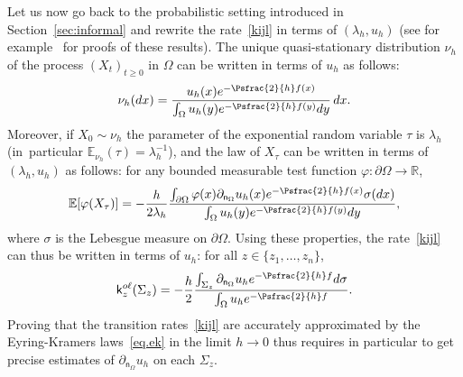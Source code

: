 Let us now go back to the probabilistic setting introduced
in Section~\ref{sec:informal} and rewrite the rate~\eqref{kijl} in
terms of $(\lambda_h,u_h)$ (see for example~\cite{le2012mathematical}
for proofs of these results). The unique quasi-stationary distribution $\nu_h$ of the
process $(X_t)_{t \ge 0}$ in $\Omega$ can be written in terms of $u_h$
as follows:\vspace*{-3pt}
\begin{equation} \label{eq.expQSD}
\nu_h(dx)=\frac{ u_{h}(x) e^{-\Psfrac{2}{h} f(x)}}{ \int_{\Omega}u_{h}(y) e^{-\Psfrac{2}{h} f(y)}dy}\, dx.
\end{equation}
Moreover, if $X_0 \sim \nu_h$ the parameter of the exponential random
variable $\tau$ is $\lambda_h$ (in~particular $\mathbb E_{\nu_h}(\tau)=\lambda_h^{-1}$), and the law of $X_\tau$ can be
written in terms of $(\lambda_h,u_h)$ as follows: for any bounded measurable test function
$\varphi: \partial \Omega \to \mathbb R$,
\begin{equation}\label{eq.dens}
\mathbb E [\varphi (X_\tau)]=- \frac{h}{2\lambda_{h}}
\frac{\int_{\partial \Omega}\varphi (x) \partial_{\mathsf n_\Omega}
u_{h}(x) e^{-\Psfrac{2}{h} f(x)} \sigma(dx) }{ \int_{\Omega} u_{h}(y) e^{-\Psfrac{2}{h} f(y)} dy},
\end{equation}
where $\sigma$ is the Lebesgue measure on $\partial \Omega$.
Using these properties, the rate~\eqref{kijl} can thus be written in terms
of $u_h$: for all $z \in \{z_1, \ldots, z_n\}$,\vspace*{-3pt}
\begin{equation}\label{eq.expk}
\mathsf k_{z}^{o\ell}(\Sigma_{z})=-\frac {h}{2} \frac{ \int_{\Sigma_{z}} \partial_{\mathsf n_\Omega}
u_h e^{-\Psfrac{2}{h} f} d\sigma }{ \int_\Omega u_h e^{-\Psfrac{2}{h} f}}.
\end{equation}
Proving that the transition rates~\eqref{kijl} are accurately
approximated by the Eyring-Kramers laws~\eqref{eq.ek} in the limit $h
\to 0$ thus requires in particular to get precise estimates of $\partial_{\mathsf n_\Omega}
u_h$ on each $\Sigma_{z}$.

